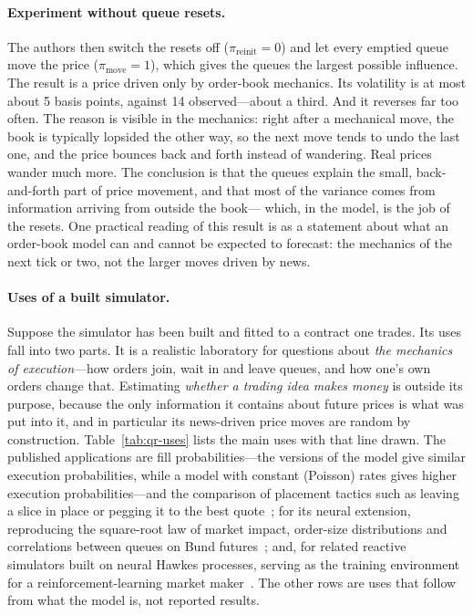 \paragraph{Experiment without queue resets.} The authors then switch the resets off ($\pi_{\text{reinit}} = 0$)
and let every emptied queue move the price ($\pi_{\text{move}} = 1$), which gives the queues the largest
possible influence. The result is a price driven only by order-book mechanics. Its volatility is at most
about 5 basis points, against 14 observed---about a third. And it reverses far too often. The reason
is visible in the mechanics: right after a mechanical move, the book is typically lopsided the other way,
so the next move tends to undo the last one, and the price bounces back and forth instead of wandering.
Real prices wander much more. The conclusion is that the queues explain the small, back-and-forth part of
price movement, and that most of the variance comes from information arriving from outside the book---
which, in the model, is the job of the resets. One practical reading of this result is as a statement about what an
order-book model can and cannot be expected to forecast: the mechanics of the next tick or two, not the
larger moves driven by news.

\paragraph{Uses of a built simulator.} Suppose the simulator has been built and
fitted to a contract one trades. Its uses fall into two parts. It is a
realistic laboratory for questions about \emph{the mechanics of execution}---how orders join, wait in and
leave queues, and how one's own orders change that. Estimating \emph{whether a trading idea makes
money} is outside its purpose, because the only information it contains about future prices is what was put
into it, and in particular its news-driven price moves are random by construction. Table~\ref{tab:qr-uses}
lists the main uses with that line drawn. The published applications are fill probabilities---the versions of the model give similar
execution probabilities, while a model with constant (Poisson) rates gives higher execution
probabilities---and the comparison of
placement tactics such as leaving a slice in place or pegging it to the best quote~\citep{huang2015}; for its neural extension, reproducing the square-root
law of market impact, order-size distributions and correlations between queues on Bund futures~\citep{deepqr};
and, for related reactive simulators built on neural Hawkes processes, serving as the training
environment for a reinforcement-learning market maker~\citep{lalor2025nhp}. The other rows are uses that
follow from what the model is, not reported results.

